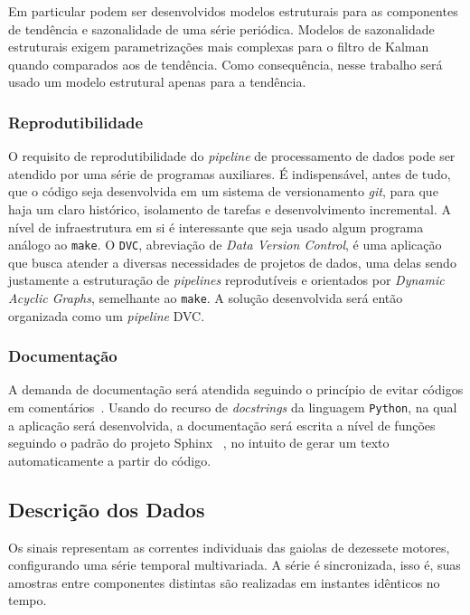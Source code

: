 Em particular podem ser desenvolvidos modelos estruturais para as componentes
de tendência e sazonalidade de uma série periódica. Modelos de sazonalidade
estruturais exigem parametrizações mais complexas para o filtro de Kalman
quando comparados aos de tendência. Como consequência, nesse trabalho será
usado um modelo estrutural apenas para a tendência.

\subsubsection{Reprodutibilidade}

O requisito de reprodutibilidade do \emph{pipeline} de processamento de dados
pode ser atendido por uma série de programas auxiliares. É indispensável,
antes de tudo, que o código seja desenvolvida em um sistema de
versionamento \emph{git}, para que haja um claro histórico, isolamento de
tarefas e desenvolvimento incremental. A nível de infraestrutura em si
é interessante que seja usado algum programa análogo ao \verb+make+. O
\verb+DVC+, abreviação de \emph{Data Version Control}, é uma aplicação que
busca atender a diversas necessidades de projetos de dados, uma delas sendo
justamente a estruturação de \emph{pipelines} reprodutíveis e orientados por
\emph{Dynamic Acyclic Graphs}, semelhante ao \verb+make+. A solução
desenvolvida será então organizada como um \emph{pipeline} DVC.

\subsubsection{Documentação}

A demanda de documentação será atendida seguindo o princípio de evitar códigos
em comentários~\cite{clean_code}. Usando do recurso de \emph{docstrings} da
linguagem \verb+Python+, na qual a aplicação será desenvolvida, a documentação
será escrita a nível de funções seguindo o padrão do projeto Sphinx
~\cite{sphinx}, no intuito de gerar um texto automaticamente a partir do código.

\subsection{Descrição dos Dados}

Os sinais representam as correntes individuais das gaiolas de dezessete
motores, configurando uma série temporal multivariada. A série é sincronizada,
isso é, suas amostras entre componentes distintas são realizadas em instantes
idênticos no tempo.

